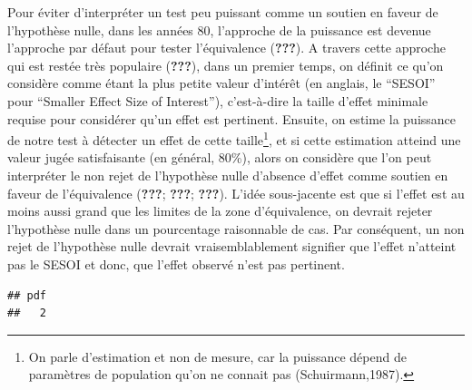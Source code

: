 \documentclass[
  english,
  man]{apa6}
\begin{document}
Pour éviter d'interpréter un test peu puissant comme un soutien en faveur de l'hypothèse nulle, dans les années 80, l'approche de la puissance est devenue l'approche par défaut pour tester l'équivalence ({\textbf{???}}). A travers cette approche qui est restée très populaire ({\textbf{???}}), dans un premier temps, on définit ce qu'on considère comme étant la plus petite valeur d'intérêt (en anglais, le \enquote{SESOI} pour \enquote{Smaller Effect Size of Interest}), c'est-à-dire la taille d'effet minimale requise pour considérer qu'un effet est pertinent. Ensuite, on estime la puissance de notre test à détecter un effet de cette taille\footnote{On parle d'estimation et non de mesure, car la puissance dépend de paramètres de population qu'on ne connait pas (Schuirmann,1987).}, et si cette estimation atteind une valeur jugée satisfaisante (en général, 80\%), alors on considère que l'on peut interpréter le non rejet de l'hypothèse nulle d'absence d'effet comme soutien en faveur de l'équivalence ({\textbf{???}}; {\textbf{???}}; {\textbf{???}}). L'idée sous-jacente est que si l'effet est au moins aussi grand que les limites de la zone d'équivalence, on devrait rejeter l'hypothèse nulle dans un pourcentage raisonnable de cas. Par conséquent, un non rejet de l'hypothèse nulle devrait vraisemblablement signifier que l'effet n'atteint pas le SESOI et donc, que l'effet observé n'est pas pertinent.

\begin{verbatim}
## pdf 
##   2
\end{verbatim}
\end{document}
